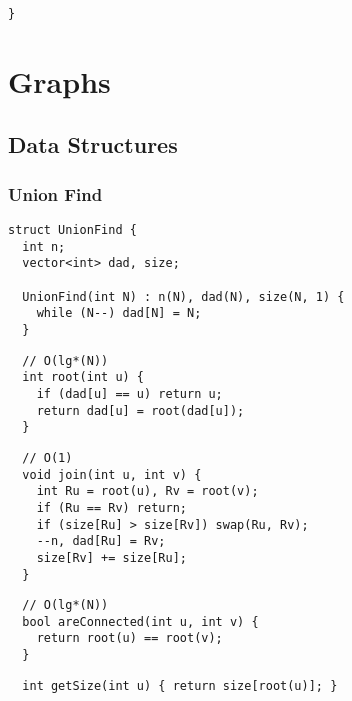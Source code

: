 \documentclass[twoside]{article}
\begin{document}
\begin{multicols*}{2}
\begin{verbatim}
}
\end{verbatim}

\sectionfont{\bfseries\sffamily\centering\Huge}
\vspace{1em}
\section*{Graphs}
\vspace{3em}
\subsectionfont{\bfseries\sffamily\centering\LARGE}
\vspace{0em}
\subsection*{Data Structures}
\vspace{2em}
\subsubsectionfont{\large\bfseries\sffamily\underline}
\subsubsection*{Union Find}
\begin{verbatim}
struct UnionFind {
  int n;
  vector<int> dad, size;

  UnionFind(int N) : n(N), dad(N), size(N, 1) {
    while (N--) dad[N] = N;
  }
\end{verbatim}
\vspace{-12pt}
\begin{verbatim}
  // O(lg*(N))
  int root(int u) {
    if (dad[u] == u) return u;
    return dad[u] = root(dad[u]);
  }
\end{verbatim}
\vspace{-12pt}
\begin{verbatim}
  // O(1)
  void join(int u, int v) {
    int Ru = root(u), Rv = root(v);
    if (Ru == Rv) return;
    if (size[Ru] > size[Rv]) swap(Ru, Rv);
    --n, dad[Ru] = Rv;
    size[Rv] += size[Ru];
  }
\end{verbatim}
\vspace{-12pt}
\begin{verbatim}
  // O(lg*(N))
  bool areConnected(int u, int v) {
    return root(u) == root(v);
  }
\end{verbatim}
\vspace{-12pt}
\begin{verbatim}
  int getSize(int u) { return size[root(u)]; }


\end{verbatim}
\end{multicols*}
\end{document}
